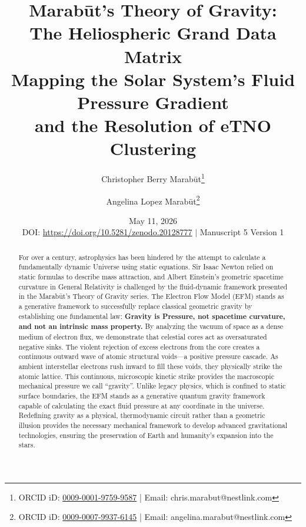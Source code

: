 \documentclass[11pt, a4paper]{article}
\title{\textbf{Marab\={u}t's Theory of Gravity: \\ The Heliospheric Grand Data Matrix} \\[1em] \large{Mapping the Solar System's Fluid Pressure Gradient \\ and the Resolution of eTNO Clustering}}
\author[1]{Christopher Berry Marab\={u}t\thanks{ORCID iD: \href{https://orcid.org/0009-0001-9759-9587}{0009-0001-9759-9587} | Email: chris.marabut@nestlink.com}}
\author[1]{Angelina Lopez Marab\={u}t\thanks{ORCID iD: \href{https://orcid.org/0009-0007-9937-6145}{0009-0007-9937-6145} | Email: angelina.marabut@nestlink.com}}
\affil[1]{Independent Researchers}
\date{May 11, 2026 \\[1.5em] \small{DOI: \url{https://doi.org/10.5281/zenodo.20128777} $|$ Manuscript 5 Version 1}}
\begin{document}
\maketitle

\begin{abstract}
  For over a century, astrophysics has been hindered by the attempt to calculate a fundamentally dynamic Universe using static equations. Sir Isaac Newton relied on static formulas to describe mass attraction, and Albert Einstein's geometric spacetime curvature in General Relativity is challenged by the fluid-dynamic framework presented in the Marab\={u}t's Theory of Gravity series. The Electron Flow Model (EFM) stands as a generative framework to successfully replace classical geometric gravity by establishing one fundamental law: \textbf{Gravity is Pressure, not spacetime curvature, and not an intrinsic mass property.} By analyzing the vacuum of space as a dense medium of electron flux, we demonstrate that celestial cores act as oversaturated negative sinks. The violent rejection of excess electrons from the core creates a continuous outward wave of atomic structural voids---a positive pressure cascade. As ambient interstellar electrons rush inward to fill these voids, they physically strike the atomic lattice. This continuous, microscopic kinetic strike provides the macroscopic mechanical pressure we call ``gravity''. Unlike legacy physics, which is confined to static surface boundaries, the EFM stands as a generative quantum gravity framework capable of calculating the exact fluid pressure at any coordinate in the universe. Redefining gravity as a physical, thermodynamic circuit rather than a geometric illusion provides the necessary mechanical framework to develop advanced gravitational technologies, ensuring the preservation of Earth and humanity's expansion into the stars.
\end{abstract}
\end{document}
